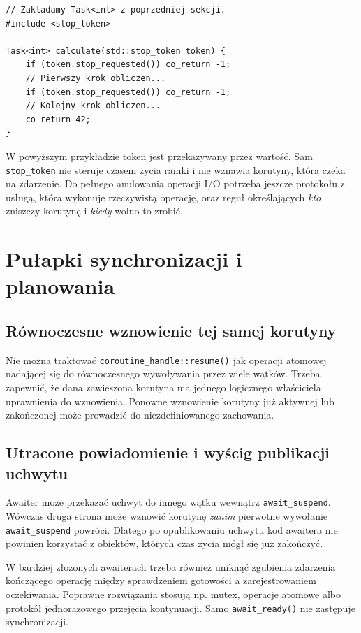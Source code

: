\begin{lstlisting}[caption={Kooperacyjne anulowanie korutyny: sprawdzenie żądania w punktach kontrolnych; fragment.}]
// Zakladamy Task<int> z poprzedniej sekcji.
#include <stop_token>

Task<int> calculate(std::stop_token token) {
    if (token.stop_requested()) co_return -1;
    // Pierwszy krok obliczen...
    if (token.stop_requested()) co_return -1;
    // Kolejny krok obliczen...
    co_return 42;
}
\end{lstlisting}

W powyższym przykładzie token jest przekazywany przez wartość.
Sam \texttt{stop\_token} nie steruje czasem życia ramki i nie
wznawia korutyny, która czeka na zdarzenie. Do pełnego anulowania
operacji I/O potrzeba jeszcze protokołu z usługą, która wykonuje
rzeczywistą operację, oraz reguł określających \emph{kto} zniszczy
korutynę i \emph{kiedy} wolno to zrobić.

\section{Pułapki synchronizacji i planowania}

\subsection{Równoczesne wznowienie tej samej korutyny}

Nie można traktować \texttt{coroutine\_handle::resume()} jak
operacji atomowej nadającej się do równoczesnego wywoływania przez
wiele wątków. Trzeba zapewnić, że dana zawieszona korutyna ma
jednego logicznego właściciela uprawnienia do wznowienia.
Ponowne wznowienie korutyny już aktywnej lub zakończonej może
prowadzić do niezdefiniowanego zachowania.

\subsection{Utracone powiadomienie i wyścig publikacji uchwytu}

Awaiter może przekazać uchwyt do innego wątku wewnątrz
\texttt{await\_suspend}. Wówczas druga strona może wznowić korutynę
\emph{zanim} pierwotne wywołanie \texttt{await\_suspend} powróci.
Dlatego po opublikowaniu uchwytu kod awaitera nie powinien korzystać
z obiektów, których czas życia mógł się już zakończyć.

W bardziej złożonych awaiterach trzeba również uniknąć zgubienia
zdarzenia kończącego operację między sprawdzeniem gotowości a
zarejestrowaniem oczekiwania. Poprawne rozwiązania stosują np.
mutex, operacje atomowe albo protokół jednorazowego przejęcia
kontynuacji. Samo \texttt{await\_ready()} nie zastępuje synchronizacji.

